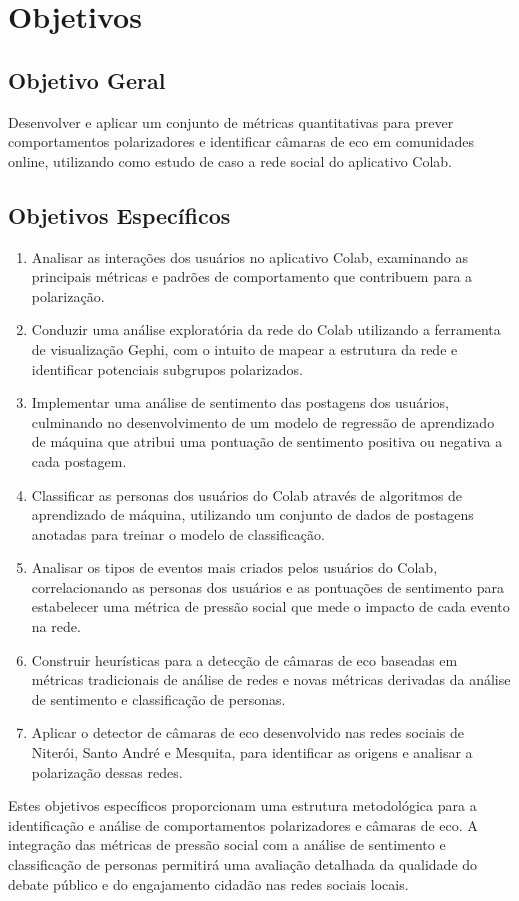 \section{Objetivos}

\subsection{Objetivo Geral}
Desenvolver e aplicar um conjunto de métricas quantitativas para prever comportamentos polarizadores e identificar câmaras de eco em comunidades online, utilizando como estudo de caso a rede social do aplicativo Colab.

\subsection{Objetivos Específicos}
\begin{enumerate}
	\item Analisar as interações dos usuários no aplicativo Colab, examinando as principais métricas e padrões de comportamento que contribuem para a polarização.

	\item Conduzir uma análise exploratória da rede do Colab utilizando a ferramenta de visualização Gephi, com o intuito de mapear a estrutura da rede e identificar potenciais subgrupos polarizados.

	\item Implementar uma análise de sentimento das postagens dos usuários, culminando no desenvolvimento de um modelo de regressão de aprendizado de máquina que atribui uma pontuação de sentimento positiva ou negativa a cada postagem.

	\item Classificar as personas dos usuários do Colab através de algoritmos de aprendizado de máquina, utilizando um conjunto de dados de postagens anotadas para treinar o modelo de classificação.

	\item Analisar os tipos de eventos mais criados pelos usuários do Colab, correlacionando as personas dos usuários e as pontuações de sentimento para estabelecer uma métrica de pressão social que mede o impacto de cada evento na rede.

	\item Construir heurísticas para a detecção de câmaras de eco baseadas em métricas tradicionais de análise de redes e novas métricas derivadas da análise de sentimento e classificação de personas.

	\item Aplicar o detector de câmaras de eco desenvolvido nas redes sociais de Niterói, Santo André e Mesquita, para identificar as origens e analisar a polarização dessas redes.
\end{enumerate}

Estes objetivos específicos proporcionam uma estrutura metodológica para a identificação e análise de comportamentos polarizadores e câmaras de eco. A integração das métricas de pressão social com a análise de sentimento e classificação de personas permitirá uma avaliação detalhada da qualidade do debate público e do engajamento cidadão nas redes sociais locais.
